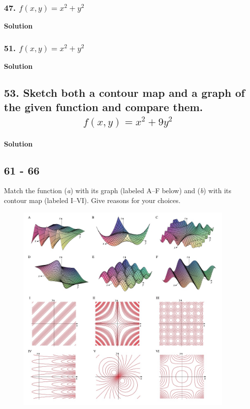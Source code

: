 \documentclass{article}
\begin{document}
\subsubsection*{47. $f(x,y) = x^2 + y^2$}
\centerline{\textbf{Solution}}
\subsubsection*{51. $f(x,y) = x^2 + y^2$}
\centerline{\textbf{Solution}}
\subsection*{53. Sketch both a contour map and a graph of the given function and compare them. \\ \begin{align*} f(x,y) = x^2 + 9y^2 \end{align*}}
\centerline{\textbf{Solution}}
\subsection*{61 - 66} 
Match the function (\textit a) with its graph (labeled A–F below) and (\textit b) with its contour map (labeled I–VI). Give reasons for your choices.

\begin{figure}[h] %
    \begin{center}
        \includegraphics[width=0.95\textwidth]{figures/61-66.jpg}
    \end{center}
\end{figure}
\end{document}
